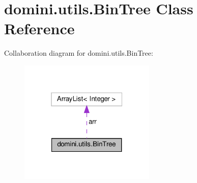 \hypertarget{classdomini_1_1utils_1_1BinTree}{}\section{domini.\+utils.\+Bin\+Tree Class Reference}
\label{classdomini_1_1utils_1_1BinTree}


Collaboration diagram for domini.\+utils.\+Bin\+Tree\+:\nopagebreak
\begin{figure}[H]
\begin{center}
\leavevmode
\includegraphics[width=184pt]{classdomini_1_1utils_1_1BinTree__coll__graph}
\end{center}
\end{figure}
